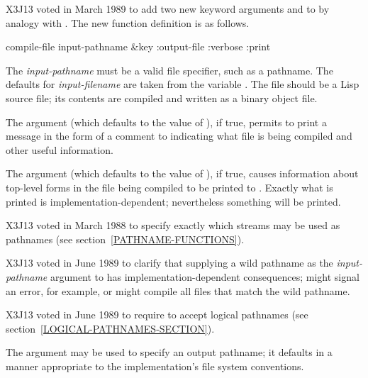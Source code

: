 X3J13 voted in March 1989  to add two new
keyword arguments  and 
to  by analogy with .
The new function definition is as follows.

\begin{defun}[Function]
compile-file input-pathname &key :output-file :verbose :print

The \emph{input-pathname} must be a valid file specifier, such as a pathname.
The defaults for \emph{input-filename} are taken from the variable
.
The file should be a Lisp source file;
its contents are compiled and written as a binary object file.

The  argument (which defaults to the value of
), if true, permits  to print a message
in the form of a comment to  indicating what file is
being compiled and other useful information.

The  argument (which defaults to the value of ),
if true, causes information about top-level forms in the file being
compiled to be printed to .  Exactly what is printed
is implementation-dependent; nevertheless something will be printed.
\end{defun}

\begin{new}
X3J13 voted in March 1988
to specify exactly which streams may be used as pathnames
(see section~\ref{PATHNAME-FUNCTIONS}).
\end{new}
\begin{newer}
X3J13 voted in June 1989 
to clarify that supplying a wild pathname
as the \emph{input-pathname} argument to  has implementation-dependent consequences;
 might signal an error, for example,
or might compile all files that match the wild pathname.
\end{newer}

\begin{newer}
X3J13 voted in June 1989  to require 
to accept logical pathnames (see section~\ref{LOGICAL-PATHNAMES-SECTION}).
\end{newer}

The  argument may be used to specify an output pathname;
it defaults in a manner
appropriate to the implementation's file system conventions.


